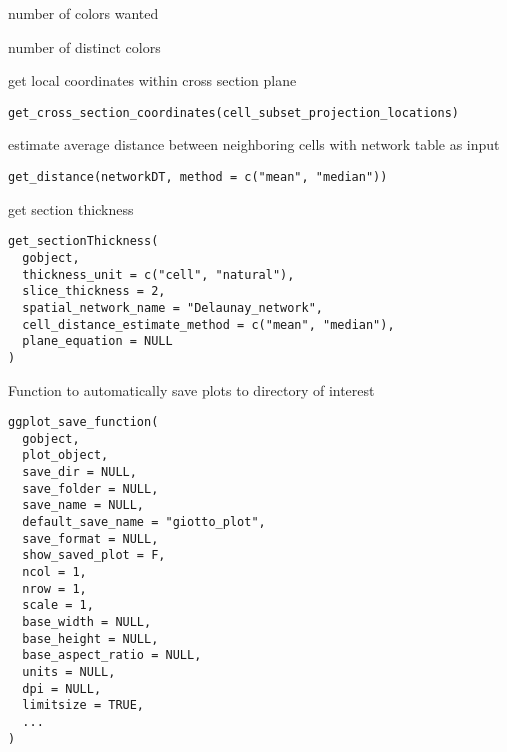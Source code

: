 \documentclass[a4paper]{book}
\begin{document}
%
\begin{Arguments}
\begin{ldescription}
\item[\code{n}] number of colors wanted
\end{ldescription}
\end{Arguments}
%
\begin{Value}
number of distinct colors
\end{Value}
%
\begin{Description}\relax
get local coordinates within cross section plane
\end{Description}
%
\begin{Usage}
\begin{verbatim}
get_cross_section_coordinates(cell_subset_projection_locations)
\end{verbatim}
\end{Usage}
%
\begin{Description}\relax
estimate average distance between neighboring cells with network table as input
\end{Description}
%
\begin{Usage}
\begin{verbatim}
get_distance(networkDT, method = c("mean", "median"))
\end{verbatim}
\end{Usage}
%
\begin{Description}\relax
get section thickness
\end{Description}
%
\begin{Usage}
\begin{verbatim}
get_sectionThickness(
  gobject,
  thickness_unit = c("cell", "natural"),
  slice_thickness = 2,
  spatial_network_name = "Delaunay_network",
  cell_distance_estimate_method = c("mean", "median"),
  plane_equation = NULL
)
\end{verbatim}
\end{Usage}
%
\begin{Description}\relax
Function to automatically save plots to directory of interest
\end{Description}
%
\begin{Usage}
\begin{verbatim}
ggplot_save_function(
  gobject,
  plot_object,
  save_dir = NULL,
  save_folder = NULL,
  save_name = NULL,
  default_save_name = "giotto_plot",
  save_format = NULL,
  show_saved_plot = F,
  ncol = 1,
  nrow = 1,
  scale = 1,
  base_width = NULL,
  base_height = NULL,
  base_aspect_ratio = NULL,
  units = NULL,
  dpi = NULL,
  limitsize = TRUE,
  ...
)
\end{verbatim}
\end{Usage}
\end{document}
